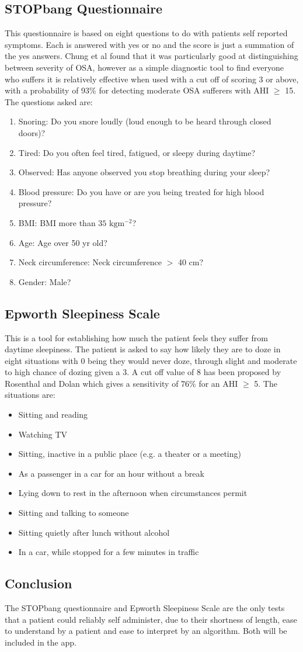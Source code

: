 \subsection{STOPbang Questionnaire}
This questionnaire is based on eight questions to do with patients self reported symptoms. Each is answered with yes or no and the score is just a summation of the yes answers. Chung et al found that it was particularly good at distinguishing between severity of OSA, however as a simple diagnostic tool to find everyone who suffers it is relatively effective when used with a cut off of scoring 3 or above, with a probability of 93\% for detecting moderate OSA sufferers with AHI $\geq$ 15. The questions asked are:
\begin{enumerate}
\item Snoring: Do you snore loudly (loud enough to be heard through closed doors)?
\item Tired: Do you often feel tired, fatigued, or sleepy during daytime?
\item Observed: Has anyone observed you stop breathing during your sleep?
\item Blood pressure: Do you have or are you being treated for high blood pressure?
\item BMI: BMI more than $35 \text{ kg} \text{m}^{−2}$?
\item Age: Age over 50 yr old?
\item Neck circumference: Neck circumference $>$ 40 cm?
\item Gender: Male?
\end{enumerate}

\subsection{Epworth Sleepiness Scale}
This is a tool for establishing how much the patient feels they suffer from daytime sleepiness. The patient is asked to say how likely they are to doze in eight situations with 0 being they would never doze, through slight and moderate to high chance of dozing given a 3. A cut off value of 8 has been proposed by Rosenthal and Dolan which gives a sensitivity of 76\% for an AHI $\geq$ 5. The situations are:
\begin{itemize}
\item Sitting and reading
\item Watching TV
\item Sitting, inactive in a public place (e.g. a theater or a meeting)
\item As a passenger in a car for an hour without a break
\item Lying down to rest in the afternoon when circumstances permit
\item Sitting and talking to someone
\item Sitting quietly after lunch without alcohol
\item In a car, while stopped for a few minutes in traffic
\end{itemize}

\subsection{Conclusion}
The STOPbang questionnaire and Epworth Sleepiness Scale are the only tests that a patient could reliably self administer, due to their shortness of length, ease to understand by a patient and ease to interpret by an algorithm. Both will be included in the app.
